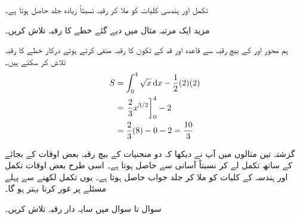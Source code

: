 تکمل اور ہندسی  کلیات کو ملا کر رقبہ نسبتاً زیادہ جلد حاصل ہوتا ہے۔

مزید ایک  مرتبہ مثال  میں دیے گئے خطے کا رقبہ تلاش کریں۔

ہم  محور   اور     کے بیچ رقبہ سے  قاعدہ   اور قد  کے تکون کا رقبہ منفی کرتے ہوئے درکار خطے کا رقبہ تلاش کر سکتے ہیں۔ 
\begin{align*}
S&=\int_0^4\sqrt{x}\dif x-\frac{1}{2}(2)(2)\\
&=\left. \frac{2}{3}x^{3/2}\right]_0^4-2\\
&=\frac{2}{3}(8)-0-2=\frac{10}{3}
\end{align*}

گزشتہ تین مثالوں میں آپ نے دیکھا کہ دو منحنیات کے بیچ رقبہ بعض اوقات  کے بجائے  کے ساتھ تکمل لے کر نسبتاً آسانی سے حاصل ہوتا ہے۔ اسی طرح بعض اوقات تکمل اور ہندسہ کے کلیات کو ملا کر جلد جواب حاصل ہوتا ہے۔ یوں تکمل لکھنے سے پہلے مسئلے پر غور کرنا بہتر ہو گا۔


سوال  تا سوال  میں سایہ دار رقبہ تلاش کریں۔

